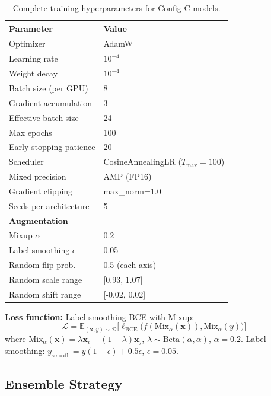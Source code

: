 \begin{table}[H]
\centering
\caption{Complete training hyperparameters for Config C models.}
\label{tab:training_hyperparams}
\begin{tabular}{ll}
\toprule
\textbf{Parameter} & \textbf{Value} \\
\midrule
Optimizer & AdamW \\
Learning rate & $10^{-4}$ \\
Weight decay & $10^{-4}$ \\
Batch size (per GPU) & 8 \\
Gradient accumulation & 3 \\
Effective batch size & 24 \\
Max epochs & 100 \\
Early stopping patience & 20 \\
Scheduler & CosineAnnealingLR ($T_{\text{max}}=100$) \\
Mixed precision & AMP (FP16) \\
Gradient clipping & max\_norm=1.0 \\
Seeds per architecture & 5 \\
\midrule
\textbf{Augmentation} & \\
Mixup $\alpha$ & 0.2 \\
Label smoothing $\epsilon$ & 0.05 \\
Random flip prob. & 0.5 (each axis) \\
Random scale range & [0.93, 1.07] \\
Random shift range & [-0.02, 0.02] \\
\bottomrule
\end{tabular}
\end{table}

\textbf{Loss function:} Label-smoothing BCE with Mixup:
\begin{equation}
\mathcal{L} = \mathbb{E}_{(\mathbf{x},y)\sim\mathcal{D}} \Big[ \ell_{\text{BCE}}\big(f(\text{Mix}_\alpha(\mathbf{x})), \text{Mix}_\alpha(y)\big) \Big]
\end{equation}
where $\text{Mix}_\alpha(\mathbf{x}) = \lambda \mathbf{x}_i + (1-\lambda)\mathbf{x}_j$, $\lambda \sim \text{Beta}(\alpha,\alpha)$, $\alpha=0.2$. Label smoothing: $y_{\text{smooth}} = y(1-\epsilon) + 0.5\epsilon$, $\epsilon=0.05$.

\subsection{Ensemble Strategy}
\label{sec:ensemble}

